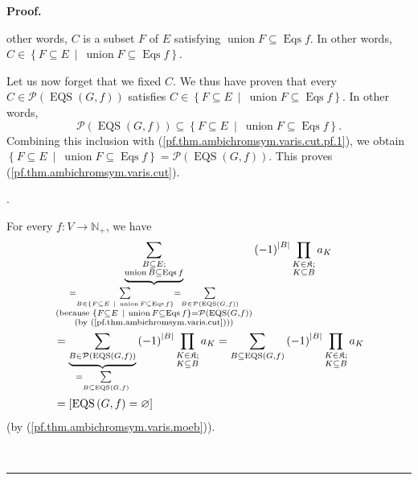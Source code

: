 \documentclass[numbers=enddot,12pt,final,onecolumn,notitlepage]{scrartcl}%
\theoremstyle{definition}
\newenvironment{proof}[1][Proof]{\noindent\textbf{#1.} }{\ \rule{0.5em}{0.5em}}
\newenvironment{verlong}{}{}
\let\sumnonlimits\sum
\let\prodnonlimits\prod
\renewcommand{\sum}{\sumnonlimits\limits}
\renewcommand{\prod}{\prodnonlimits\limits}
\begin{document}
\begin{verlong}
\begin{proof}
{other words, $C$ is a subset $F$ of $E$ satisfying $\operatorname*{union}%
F\subseteq\operatorname*{Eqs}f$. In other words, $C\in\left\{  F\subseteq
E\ \mid\ \operatorname*{union}F\subseteq\operatorname*{Eqs}f\right\}  $.
\par
Let us now forget that we fixed $C$. We thus have proven that every
$C\in\mathcal{P}\left(  \operatorname*{EQS}\left(  G,f\right)  \right)  $
satisfies $C\in\left\{  F\subseteq E\ \mid\ \operatorname*{union}%
F\subseteq\operatorname*{Eqs}f\right\}  $. In other words,%
\[
\mathcal{P}\left(  \operatorname*{EQS}\left(  G,f\right)  \right)
\subseteq\left\{  F\subseteq E\ \mid\ \operatorname*{union}F\subseteq
\operatorname*{Eqs}f\right\}  .
\]
Combining this inclusion with (\ref{pf.thm.ambichromsym.varis.cut.pf.1}), we
obtain $\left\{  F\subseteq E\ \mid\ \operatorname*{union}F\subseteq
\operatorname*{Eqs}f\right\}  =\mathcal{P}\left(  \operatorname*{EQS}\left(
G,f\right)  \right)  $. This proves (\ref{pf.thm.ambichromsym.varis.cut}).}.

For every $f:V\rightarrow\mathbb{N}_{+}$, we have%
\begin{align}
&  \underbrace{\sum_{\substack{B\subseteq E;\\\operatorname*{union}%
B\subseteq\operatorname*{Eqs}f}}}_{\substack{=\sum_{B\in\left\{  F\subseteq
E\ \mid\ \operatorname*{union}F\subseteq\operatorname*{Eqs}f\right\}  }%
=\sum_{B\in\mathcal{P}\left(  \operatorname*{EQS}\left(  G,f\right)  \right)
}\\\text{(because }\left\{  F\subseteq E\ \mid\ \operatorname*{union}%
F\subseteq\operatorname*{Eqs}f\right\}  =\mathcal{P}\left(
\operatorname*{EQS}\left(  G,f\right)  \right)  \\\text{(by
(\ref{pf.thm.ambichromsym.varis.cut})))}}}\left(  -1\right)  ^{\left\vert
B\right\vert }\prod_{\substack{K\in\mathfrak{K};\\K\subseteq B}}a_{K}%
\nonumber\\
&  =\underbrace{\sum_{B\in\mathcal{P}\left(  \operatorname*{EQS}\left(
G,f\right)  \right)  }}_{=\sum_{B\subseteq\operatorname*{EQS}\left(
G,f\right)  }}\left(  -1\right)  ^{\left\vert B\right\vert }\prod
_{\substack{K\in\mathfrak{K};\\K\subseteq B}}a_{K}=\sum_{B\subseteq
\operatorname*{EQS}\left(  G,f\right)  }\left(  -1\right)  ^{\left\vert
B\right\vert }\prod_{\substack{K\in\mathfrak{K};\\K\subseteq B}}a_{K}%
\nonumber\\
&  =\left[  \operatorname*{EQS}\left(  G,f\right)  =\varnothing\right]
\label{pf.thm.ambichromsym.varis.moeb2}%
\end{align}
(by (\ref{pf.thm.ambichromsym.varis.moeb})).


\end{proof}
\end{verlong}
\end{document}
